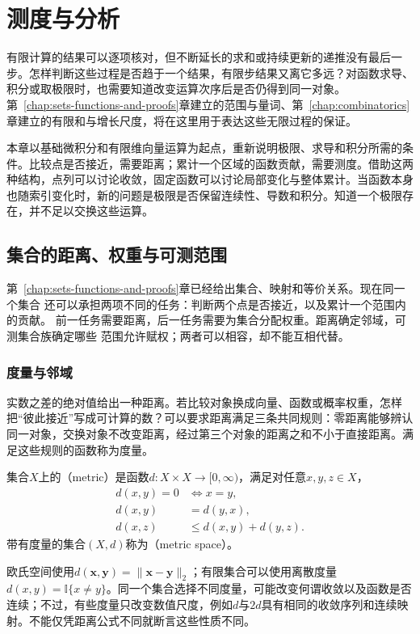 \chapter{测度与分析}
\label{chap:mathematical-analysis}

有限计算的结果可以逐项核对，但不断延长的求和或持续更新的递推没有最后一步。怎样判断这些过程是否趋于一个结果，有限步结果又离它多远？对函数求导、积分或取极限时，也需要知道改变运算次序后是否仍得到同一对象。第~\ref{chap:sets-functions-and-proofs}章建立的范围与量词、第~\ref{chap:combinatorics}章建立的有限和与增长尺度，将在这里用于表达这些无限过程的保证。

本章以基础微积分和有限维向量运算为起点，重新说明极限、求导和积分所需的条件。比较点是否接近，需要距离；累计一个区域的函数贡献，需要测度。借助这两种结构，点列可以讨论收敛，固定函数可以讨论局部变化与整体累计。当函数本身也随索引变化时，新的问题是极限是否保留连续性、导数和积分。知道一个极限存在，并不足以交换这些运算。

\section{集合的距离、权重与可测范围}
\label{sec:analysis-set-structures}

第~\ref{chap:sets-functions-and-proofs}章已经给出集合、映射和等价关系。现在同一个集合
还可以承担两项不同的任务：判断两个点是否接近，以及累计一个范围内的贡献。
前一任务需要距离，后一任务需要为集合分配权重。距离确定邻域，可测集合族确定哪些
范围允许赋权；两者可以相容，却不能互相代替。

\subsection{度量与邻域}

实数之差的绝对值给出一种距离。若比较对象换成向量、函数或概率权重，怎样把“彼此接近”写成可计算的数？可以要求距离满足三条共同规则：零距离能够辨认同一对象，交换对象不改变距离，经过第三个对象的距离之和不小于直接距离。满足这些规则的函数称为度量。
\begin{definition}[度量与度量空间]
\label{def:analysis-metric-space}
集合$X$上的（metric）是函数$d:X\times X\to[0,\infty)$，满足对任意$x,y,z\in X$，
\[
  \begin{aligned}
    d(x,y)=0&\Longleftrightarrow x=y,\\
    d(x,y)&=d(y,x),\\
    d(x,z)&\leq d(x,y)+d(y,z).
  \end{aligned}
\]
带有度量的集合$(X,d)$称为（metric space）。
\end{definition}
欧氏空间使用$d(\bm{x},\bm{y})=\lVert\bm{x}-\bm{y}\rVert_2$；有限集合可以使用离散度量$d(x,y)=\mathbb{I}\{x\neq y\}$。同一个集合选择不同度量，可能改变何谓收敛以及函数是否连续；不过，有些度量只改变数值尺度，例如$d$与$2d$具有相同的收敛序列和连续映射。不能仅凭距离公式不同就断言这些性质不同。

